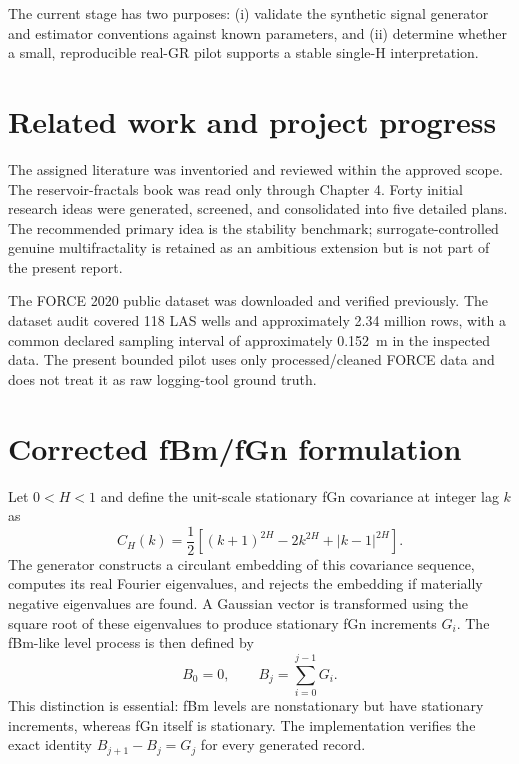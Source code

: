 \documentclass[11pt,a4paper]{article}
\begin{document}
The current stage has two purposes: (i) validate the synthetic signal generator and estimator conventions against known parameters, and (ii) determine whether a small, reproducible real-GR pilot supports a stable single-H interpretation.

\section{Related work and project progress}
The assigned literature was inventoried and reviewed within the approved scope. The reservoir-fractals book was read only through Chapter 4. Forty initial research ideas were generated, screened, and consolidated into five detailed plans. The recommended primary idea is the stability benchmark; surrogate-controlled genuine multifractality is retained as an ambitious extension but is not part of the present report.

The FORCE 2020 public dataset was downloaded and verified previously. The dataset audit covered 118 LAS wells and approximately 2.34 million rows, with a common declared sampling interval of approximately 0.152~m in the inspected data. The present bounded pilot uses only processed/cleaned FORCE data and does not treat it as raw logging-tool ground truth.

\section{Corrected fBm/fGn formulation}
Let $0<H<1$ and define the unit-scale stationary fGn covariance at integer lag $k$ as
\begin{equation}
C_H(k)=\frac{1}{2}\left[(k+1)^{2H}-2k^{2H}+|k-1|^{2H}\right].
\label{eq:fgncov}
\end{equation}
The generator constructs a circulant embedding of this covariance sequence, computes its real Fourier eigenvalues, and rejects the embedding if materially negative eigenvalues are found. A Gaussian vector is transformed using the square root of these eigenvalues to produce stationary fGn increments $G_i$. The fBm-like level process is then defined by
\begin{equation}
B_0=0, \qquad B_j=\sum_{i=0}^{j-1}G_i.
\label{eq:cumsum}
\end{equation}
This distinction is essential: fBm levels are nonstationary but have stationary increments, whereas fGn itself is stationary. The implementation verifies the exact identity $B_{j+1}-B_j=G_j$ for every generated record.
\end{document}
